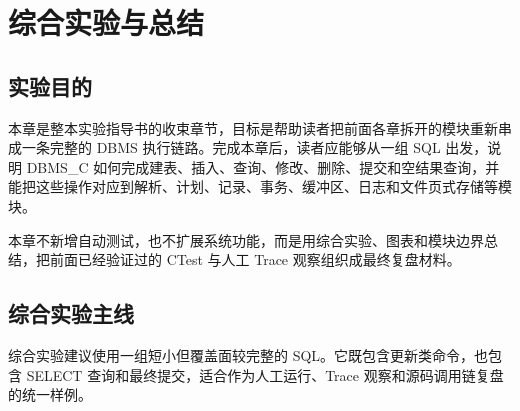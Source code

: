 ﻿\chapter{综合实验与总结}
\label{chap:integration}

\section{实验目的}

本章是整本实验指导书的收束章节，目标是帮助读者把前面各章拆开的模块重新串成一条完整的 DBMS 执行链路。完成本章后，读者应能够从一组 SQL 出发，说明 DBMS\_C 如何完成建表、插入、查询、修改、删除、提交和空结果查询，并能把这些操作对应到解析、计划、记录、事务、缓冲区、日志和文件页式存储等模块。

本章不新增自动测试，也不扩展系统功能，而是用综合实验、图表和模块边界总结，把前面已经验证过的 CTest 与人工 Trace 观察组织成最终复盘材料。

\section{综合实验主线}

综合实验建议使用一组短小但覆盖面较完整的 SQL。它既包含更新类命令，也包含 SELECT 查询和最终提交，适合作为人工运行、Trace 观察和源码调用链复盘的统一样例。

